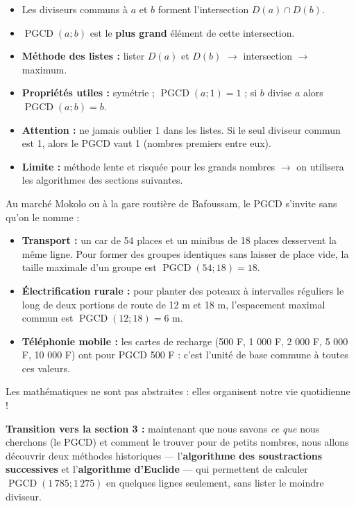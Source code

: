 \documentclass[11pt]{article}
\newcounter{popsec}
\newcounter{popsub}
\newcommand{\courssub}[1]{%
  \stepcounter{popsub}%
  \par\vspace{9pt}\noindent{\popxbold\fontsize{11.5}{13}\selectfont\color{popink}{\color{poporange}\thepopsec.\thepopsub}\hspace{6pt}#1}\par\nopagebreak\vspace{4pt}
}
\begin{document}
\courssub{Synthèse de la section}

\begin{aretenir}
\begin{itemize}
  \item Les diviseurs communs à $a$ et $b$ forment l'intersection $D(a) \cap D(b)$.
  \item $\operatorname{PGCD}(a;b)$ est le \textbf{plus grand} élément de cette intersection.
  \item \textbf{Méthode des listes :} lister $D(a)$ et $D(b)$ $\rightarrow$ intersection $\rightarrow$ maximum.
  \item \textbf{Propriétés utiles :} symétrie ; $\operatorname{PGCD}(a;1)=1$ ; si $b$ divise $a$ alors $\operatorname{PGCD}(a;b)=b$.
  \item \textbf{Attention :} ne jamais oublier 1 dans les listes. Si le seul diviseur commun est 1, alors le PGCD vaut 1 (nombres premiers entre eux).
  \item \textbf{Limite :} méthode lente et risquée pour les grands nombres $\rightarrow$ on utilisera les algorithmes des sections suivantes.
\end{itemize}
\end{aretenir}

\begin{savaistu}
Au marché Mokolo ou à la gare routière de Bafoussam, le PGCD s'invite sans qu'on le nomme :
\begin{itemize}
  \item \textbf{Transport :} un car de 54 places et un minibus de 18 places desservent la même ligne. Pour former des groupes identiques sans laisser de place vide, la taille maximale d'un groupe est $\operatorname{PGCD}(54;18)=18$.
  \item \textbf{Électrification rurale :} pour planter des poteaux à intervalles réguliers le long de deux portions de route de 12 m et 18 m, l'espacement maximal commun est $\operatorname{PGCD}(12;18)=6$ m.
  \item \textbf{Téléphonie mobile :} les cartes de recharge (500 F, 1 000 F, 2 000 F, 5 000 F, 10 000 F) ont pour PGCD 500 F : c'est l'unité de base commune à toutes ces valeurs.
\end{itemize}
Les mathématiques ne sont pas abstraites : elles organisent notre vie quotidienne !
\end{savaistu}

\textbf{Transition vers la section 3 :} maintenant que nous savons \emph{ce que} nous cherchons (le PGCD) et comment le trouver pour de petits nombres, nous allons découvrir deux méthodes historiques — l'\textbf{algorithme des soustractions successives} et l'\textbf{algorithme d'Euclide} — qui permettent de calculer $\operatorname{PGCD}(1\,785;1\,275)$ en quelques lignes seulement, sans lister le moindre diviseur.
\end{document}
